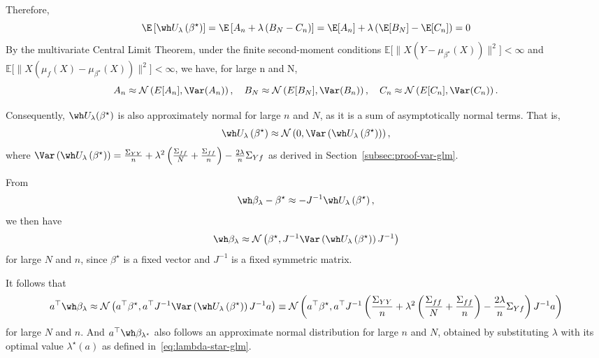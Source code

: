 \noindent
Therefore,\[
\E\left[\wh U_\lambda\left(\beta^\star\right)\right]
=\E\left[A_n+\lambda\left(B_N-C_n\right)\right]
=\E[A_n]+\lambda\left(\E[B_N]-\E[C_n]\right)=0
\]
By the multivariate Central Limit Theorem, under the finite second-moment conditions $\mathbb{E}\big[\|X(Y-\mu_{\beta^\star}(X))\|^2\big] < \infty$ and $\mathbb{E}\big[\|X(\mu_f(X)-\mu_{\beta^\star}(X))\|^2\big] < \infty$, we have, for large n and N, \[
A_n\approx\mathcal{N}\left(E[A_n],\Var(A_n)\right),\quad
B_N\approx\mathcal{N}\left(E[B_N],\Var(B_n)\right),\quad
C_n\approx\mathcal{N}\left(E[C_n],\Var(C_n)\right).
\]

\noindent
Consequently, $\wh U_\lambda(\beta^\star)$ is also approximately normal for large $n$ and $N$, as it is a sum of asymptotically normal terms. That is,\[
\wh U_\lambda\left(\beta^\star\right)\approx \mathcal{N}\left(0,\Var\left(\wh U_\lambda\left(\beta^\star\right)\right)\right),
\]where $\Var\left(\wh U_\lambda\left(\beta^\star\right)\right)=\frac{\Sigma_{YY}}{n}+\lambda^2\left(\frac{\Sigma_{ff}}{N}+\frac{\Sigma_{ff}}{n}\right)-\frac{2\lambda}{n}\Sigma_{Yf}$ as derived in Section~\ref{subsec:proof-var-glm}. 

\noindent
From\begin{align*}
    \wh\beta_\lambda-\beta^\star
    \approx-J^{-1}\wh U_\lambda\left(\beta^\star\right),
\end{align*}we then have\begin{align*}
    \wh\beta_\lambda\approx
    \mathcal{N}\left(\beta^\star,J^{-1}\Var\left(\wh U_\lambda\left(\beta^\star\right)\right)J^{-1}\right)
\end{align*}for large $N$ and $n$, since $\beta^\star$ is a fixed vector and $J^{-1}$ is a fixed symmetric matrix.

\noindent
It follows that\begin{align*}
    a^\top \wh\beta_\lambda\approx
    \mathcal{N}\left(a^\top\beta^\star,
    a^\top J^{-1}\Var\left(\wh U_\lambda\left(\beta^\star\right)\right)J^{-1}a\right)\equiv \mathcal{N}\left(a^\top\beta^\star,
    a^\top J^{-1}\left(\frac{\Sigma_{YY}}{n}+\lambda^2\left(\frac{\Sigma_{ff}}{N}+\frac{\Sigma_{ff}}{n}\right)-\frac{2\lambda}{n}\Sigma_{Yf}\right)J^{-1}a\right)
\end{align*}for large $N$ and $n$. And $a^\top \wh\beta_{\lambda^\star}$ also follows an approximate normal distribution for large $n$ and $N$, obtained by substituting $\lambda$ with its optimal value $\lambda^\star(a)$ as defined in~\eqref{eq:lambda-star-glm}.



